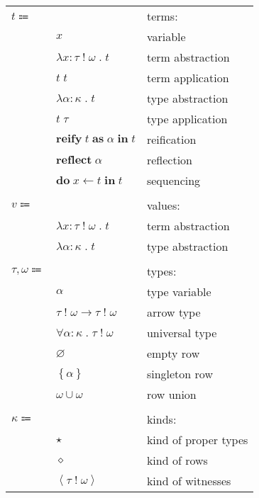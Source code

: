 \documentclass[12pt]{article}
\newcommand\kAnno[2]{#1 : #2}
\newcommand\tAnno[3]{#1 : \tEmbellished{#2}{#3}}
\newcommand\term{t}
\newcommand\eValue{v}
\newcommand\eVar{x}
\newcommand\eAbs[4]{\lambda \tAnno{#1}{#2}{#3} \; . \; #4}
\newcommand\eApp[2]{#1 \; #2}
\newcommand\eTAbs[3]{\lambda \kAnno{#1}{#2} \; . \; #3}
\newcommand\eTApp[2]{#1 \; #2}
\newcommand\eReify[3]{\textbf{reify} \; #1 \; \textbf{as} \; #2 \; \textbf{in} \; #3}
\newcommand\eReflect[1]{\textbf{reflect} \; #1}
\newcommand\eDo[3]{\textbf{do} \; #1 \leftarrow #2 \; \textbf{in} \; #3}
\newcommand\type{\tau}
\newcommand\tVar{\alpha}
\newcommand\tArrow[4]{\tEmbellished{#1}{#2} \rightarrow \tEmbellished{#3}{#4}}
\newcommand\tForAll[4]{\forall \kAnno{#1}{#2} \; . \; \tEmbellished{#3}{#4}}
\newcommand\row{\omega}
\newcommand\tEmbellished[2]{#1 \; ! \; #2}
\newcommand\tEmpty{\varnothing}
\newcommand\tSingleton[1]{\left\{ #1 \right\}}
\newcommand\tUnion[2]{#1 \cup #2}
\newcommand\kind{\kappa}
\newcommand\kType{\star}
\newcommand\kRow{\diamond}
\newcommand\kWitness[2]{\left\langle \tEmbellished{#1}{#2} \right\rangle}
\begin{document}
      \begin{figure}[H]
        \begin{mdframed}[backgroundcolor=none]
          \begin{center}
            \begin{tabular}{l l l}
              $\term \Coloneqq$ & & terms: \\
              & $\eVar$ & variable \\
              & $\eAbs{\eVar}{\type}{\row}{\term}$ & term abstraction \\
              & $\eApp{\term}{\term}$ & term application \\
              & $\eTAbs{\tVar}{\kind}{\term}$ & type abstraction \\
              & $\eTApp{\term}{\type}$ & type application \\
              & $\eReify{\term}{\tVar}{\term}$ & reification \\
              & $\eReflect{\tVar}$ & reflection \\
              & $\eDo{\eVar}{\term}{\term}$ & sequencing \\
              \\
              $\eValue \Coloneqq$ & & values: \\
              & $\eAbs{\eVar}{\type}{\row}{\term}$ & term abstraction \\
              & $\eTAbs{\tVar}{\kind}{\term}$ & type abstraction \\
              \\
              $\type, \row \Coloneqq$ & & types: \\
              & $\tVar$ & type variable \\
              & $\tArrow{\type}{\row}{\type}{\row}$ & arrow type \\
              & $\tForAll{\tVar}{\kind}{\type}{\row}$ & universal type \\
              & $\tEmpty$ & empty row \\
              & $\tSingleton{\tVar}$ & singleton row \\
              & $\tUnion{\row}{\row}$ & row union \\
              \\
              $\kind \Coloneqq$ & & kinds: \\
              & $\kType$ & kind of proper types \\
              & $\kRow$ & kind of rows \\
              & $\kWitness{\type}{\row}$ & kind of witnesses \\

\end{tabular}
\end{center}
\end{mdframed}
\end{figure}
\end{document}
